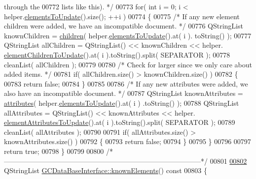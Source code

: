 \begin{DoxyCode}
{{{{{{{{{{{{{{{{{{{{{{{{{{{{{{{       through the}
00772 \textcolor{comment}{    lists like this). */}
00773   \textcolor{keywordflow}{for}( \textcolor{keywordtype}{int} i = 0; i < helper.\hyperlink{class_g_c_batch_processor_helper_aca0a2d6bbfcb23907e917b5d2251fc6f}{elementsToUpdate}().size(); ++i )
00774   \{
00775     \textcolor{comment}{/* If any new element children were added, we have an incompatible
       document. */}
00776     QStringList knownChildren = \hyperlink{class_g_c_data_base_interface_aab5126783bc3acc7c718c8ffd8af62bc}{children}( helper.\hyperlink{class_g_c_batch_processor_helper_aca0a2d6bbfcb23907e917b5d2251fc6f}{elementsToUpdate}().at( i ).
      toString() );
00777     QStringList allChildren = QStringList() << knownChildren << helper.
      \hyperlink{class_g_c_batch_processor_helper_a8fd4cac8af9a54df52a98628d5ba6fbe}{elementChildrenToUpdate}().at( i ).toString().split( SEPARATOR );
00778     cleanList( allChildren );
00779 
00780     \textcolor{comment}{/* Check for larger since we only care about added items. */}
00781     \textcolor{keywordflow}{if}( allChildren.size() > knownChildren.size() )
00782     \{
00783       \textcolor{keywordflow}{return} \textcolor{keyword}{false};
00784     \}
00785 
00786     \textcolor{comment}{/* If any new attributes were added, we also have an incompatible document.
       */}
00787     QStringList knownAttributes = \hyperlink{class_g_c_data_base_interface_afb1e49e08f98ca453f9ac66340a35642}{attributes}( helper.\hyperlink{class_g_c_batch_processor_helper_aca0a2d6bbfcb23907e917b5d2251fc6f}{elementsToUpdate}().at( i )
      .toString() );
00788     QStringList allAttributes = QStringList() << knownAttributes << helper.
      \hyperlink{class_g_c_batch_processor_helper_a3b0630e9e210b2b86e58cb43d3706b73}{elementAttributesToUpdate}().at( i ).toString().split( SEPARATOR );
00789     cleanList( allAttributes );
00790 
00791     \textcolor{keywordflow}{if}( allAttributes.size() > knownAttributes.size() )
00792     \{
00793       \textcolor{keywordflow}{return} \textcolor{keyword}{false};
00794     \}
00795   \}
00796 
00797   \textcolor{keywordflow}{return} \textcolor{keyword}{true};
00798 \}
00799 
00800 \textcolor{comment}{/*
      --------------------------------------------------------------------------------------*/}
00801 
\hypertarget{gcdatabaseinterface_8cpp_source_l00802}{}\hyperlink{class_g_c_data_base_interface_a6c4eabd4f39a1c23ab320bb0dbc855d4}{00802} QStringList \hyperlink{class_g_c_data_base_interface_a6c4eabd4f39a1c23ab320bb0dbc855d4}{GCDataBaseInterface::knownElements}()\textcolor{keyword}{ const}
00803 \textcolor{keyword}{}\{
}}}}}}}}}}}}}}}}}}}}}}}}}}}}}}
\end{DoxyCode}
